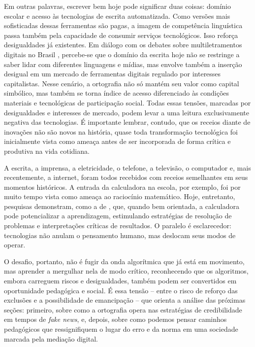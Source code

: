 \documentclass[portuguese]{textolivre}
\begin{document}
Em outras palavras, escrever bem hoje pode significar duas coisas: domínio escolar e acesso às tecnologias de escrita automatizada. Como versões mais sofisticadas dessas ferramentas são pagas, a imagem de competência linguística passa também pela capacidade de consumir serviços tecnológicos. Isso reforça desigualdades já existentes. Em diálogo com os debates sobre multiletramentos digitais no Brasil \cite{coscarelli2011letramento,rojo2009letramentos,rojo2012multiletramentos,xavier2005letramento}, percebe-se que o domínio da escrita hoje não se restringe a saber lidar com diferentes linguagens e mídias, mas envolve também a inserção desigual em um mercado de ferramentas digitais regulado por interesses capitalistas. Nesse cenário, a ortografia não só mantém seu valor como capital simbólico, mas também se torna índice de acesso diferenciado às condições materiais e tecnológicas de participação social. Todas essas tensões, marcadas por desigualdades e interesses de mercado, podem levar a uma leitura exclusivamente negativa das tecnologias. É importante lembrar, contudo, que os receios diante de inovações não são novos na história, quase toda transformação tecnológica foi inicialmente vista como ameaça antes de ser incorporada de forma crítica e produtiva na vida cotidiana.

A escrita, a imprensa, a eletricidade, o telefone, a televisão, o computador e, mais recentemente, a internet, foram todos recebidos com receios semelhantes em seus momentos históricos. A entrada da calculadora na escola, por exemplo, foi por muito tempo vista como ameaça ao raciocínio matemático. Hoje, entretanto, pesquisas demonstram, como a de \textcite{cunha2018calculadora}, que, quando bem orientada, a calculadora pode potencializar a aprendizagem, estimulando estratégias de resolução de problemas e interpretações críticas de resultados. O paralelo é esclarecedor: tecnologias não anulam o pensamento humano, mas deslocam seus modos de operar.

O desafio, portanto, não é fugir da onda algorítmica que já está em movimento, mas aprender a mergulhar nela de modo crítico, reconhecendo que os algoritmos, embora carreguem riscos e desigualdades, também podem ser convertidos em oportunidade pedagógica e social. É essa tensão – entre o risco de reforço das exclusões e a possibilidade de emancipação – que orienta a análise das próximas seções: primeiro, sobre como a ortografia opera nas estratégias de credibilidade em tempos de \textit{fake news}, e, depois, sobre como podemos pensar caminhos pedagógicos que ressignifiquem o lugar do erro e da norma em uma sociedade marcada pela mediação digital.
\end{document}
